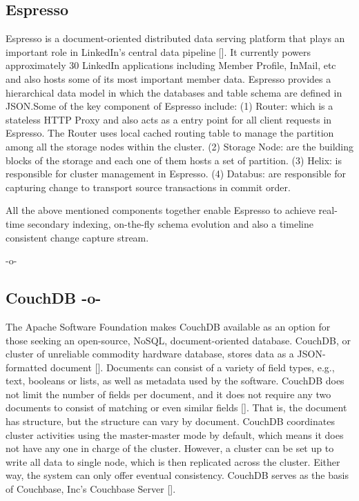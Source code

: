 \subsection{Espresso}

Espresso is a document-oriented distributed data serving platform that
plays an important role in LinkedIn's central data pipeline
[\cite{www-Linkedin-Espresso}].  It currently powers approximately 30
LinkedIn applications including Member Profile, InMail, etc and also
hosts some of its most important member data. Espresso provides a
hierarchical data model in which the databases and table schema are
defined in JSON.Some of the key component of Espresso include: (1)
Router: which is a stateless HTTP Proxy and also acts as a entry point
for all client requests in Espresso. The Router uses local cached
routing table to manage the partition among all the storage nodes
within the cluster. (2) Storage Node: are the building blocks of the
storage and each one of them hosts a set of partition. (3) Helix: is
responsible for cluster management in Espresso. (4) Databus: are
responsible for capturing change to transport source transactions in
commit order.

All the above mentioned components together enable Espresso to achieve
real-time secondary indexing, on-the-fly schema evolution and also a
timeline consistent change capture stream.

     -o-

\subsection{CouchDB -o-}
     
The Apache Software Foundation makes CouchDB available as an option
for those seeking an open-source, NoSQL, document-oriented
database. CouchDB, or cluster of unreliable commodity hardware
database, stores data as a JSON-formatted document
[\cite{www-exploringcdb-couchdb}].  Documents can consist of a variety
of field types, e.g., text, booleans or lists, as well as metadata
used by the software. CouchDB does not limit the number of fields per
document, and it does not require any two documents to consist of
matching or even similar fields
[\cite{www-techoverview-couchdb}]. That is, the document has
structure, but the structure can vary by document.  CouchDB
coordinates cluster activities using the master-master mode by
default, which means it does not have any one in charge of the
cluster.  However, a cluster can be set up to write all data to single
node, which is then replicated across the cluster.  Either way, the
system can only offer eventual consistency. CouchDB serves as the
basis of Couchbase, Inc's Couchbase Server
[\cite{www-cdb-vs-cbs-couchdb}].

